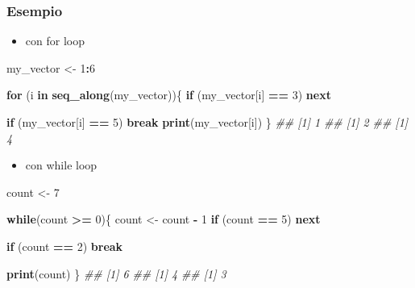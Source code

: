 \documentclass[
]{book}
\newenvironment{Shaded}{\begin{snugshade}}{\end{snugshade}}
\newcommand{\CommentTok}[1]{\textcolor[rgb]{0.56,0.35,0.01}{\textit{#1}}}
\newcommand{\ControlFlowTok}[1]{\textcolor[rgb]{0.13,0.29,0.53}{\textbf{#1}}}
\newcommand{\DecValTok}[1]{\textcolor[rgb]{0.00,0.00,0.81}{#1}}
\newcommand{\KeywordTok}[1]{\textcolor[rgb]{0.13,0.29,0.53}{\textbf{#1}}}
\newcommand{\NormalTok}[1]{#1}
\newcommand{\OperatorTok}[1]{\textcolor[rgb]{0.81,0.36,0.00}{\textbf{#1}}}
\newcommand{\StringTok}[1]{\textcolor[rgb]{0.31,0.60,0.02}{#1}}
\providecommand{\tightlist}{%
  \setlength{\itemsep}{0pt}\setlength{\parskip}{0pt}}
\begin{document}
\hypertarget{esempio-7}{%
\subsubsection*{Esempio}\label{esempio-7}}

\begin{itemize}
\tightlist
\item
  con for loop
\end{itemize}

\begin{Shaded}
\begin{Highlighting}[]
\NormalTok{my_vector <-}\StringTok{ }\DecValTok{1}\OperatorTok{:}\DecValTok{6}

\ControlFlowTok{for}\NormalTok{ (i }\ControlFlowTok{in} \KeywordTok{seq_along}\NormalTok{(my_vector))\{}
  \ControlFlowTok{if}\NormalTok{ (my_vector[i] }\OperatorTok{==}\StringTok{ }\DecValTok{3}\NormalTok{) }\ControlFlowTok{next}
  
  \ControlFlowTok{if}\NormalTok{ (my_vector[i] }\OperatorTok{==}\StringTok{ }\DecValTok{5}\NormalTok{) }\ControlFlowTok{break}
  \KeywordTok{print}\NormalTok{(my_vector[i])}
\NormalTok{\}}
\CommentTok{## [1] 1}
\CommentTok{## [1] 2}
\CommentTok{## [1] 4}
\end{Highlighting}
\end{Shaded}

\begin{itemize}
\tightlist
\item
  con while loop
\end{itemize}

\begin{Shaded}
\begin{Highlighting}[]
\NormalTok{count <-}\StringTok{ }\DecValTok{7}

\ControlFlowTok{while}\NormalTok{(count }\OperatorTok{>=}\StringTok{ }\DecValTok{0}\NormalTok{)\{}
\NormalTok{  count <-}\StringTok{ }\NormalTok{count }\OperatorTok{-}\StringTok{ }\DecValTok{1}
  \ControlFlowTok{if}\NormalTok{ (count }\OperatorTok{==}\StringTok{ }\DecValTok{5}\NormalTok{) }\ControlFlowTok{next}
  
  \ControlFlowTok{if}\NormalTok{ (count }\OperatorTok{==}\StringTok{ }\DecValTok{2}\NormalTok{) }\ControlFlowTok{break}
  
  \KeywordTok{print}\NormalTok{(count)}
\NormalTok{\}}
\CommentTok{## [1] 6}
\CommentTok{## [1] 4}
\CommentTok{## [1] 3}
\end{Highlighting}
\end{Shaded}
\end{document}
